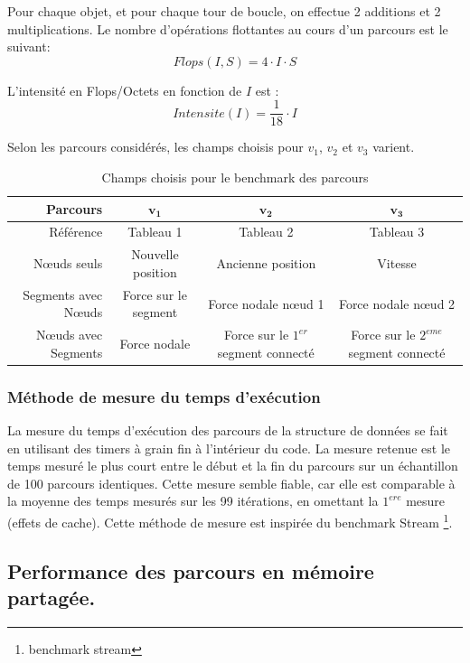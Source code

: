 Pour chaque objet, et pour chaque tour de boucle, on effectue 2 additions et 2 multiplications. Le nombre d'opérations flottantes au cours d'un parcours est le suivant:
\begin{equation}
	Flops(I,S) = 4 \cdot I \cdot S
\end{equation}

L'intensité en Flops/Octets en fonction de $I$ est :
\begin{equation}
	Intensite(I) = \frac{1}{18} \cdot I
\end{equation}

Selon les parcours considérés, les champs choisis pour $v_1$, $v_2$ et $v_3$ varient. 

\begin{table}
	\begin{tabulary}{1.0\textwidth}{r||c|C|C}
		\textbf{Parcours} & $\bm{v_1}$ & $\bm{v_2}$ & $\bm{v_3}$\\
		\hline
		\hline
		Référence & Tableau 1 & Tableau 2 & Tableau 3 \\
		\hline
		Nœuds seuls & Nouvelle position & Ancienne position & Vitesse\\
		\hline
		Segments avec Nœuds & Force sur le segment & Force nodale nœud 1 & Force nodale nœud 2\\
		\hline
		Nœuds avec Segments & Force nodale & Force sur le $1^{er}$ segment connecté & Force sur le  $2^{eme}$ segment connecté\\
	\end{tabulary}
	\caption{ Champs choisis pour le benchmark des parcours }
\end{table}

\subsubsection{Méthode de mesure du temps d'exécution}

La mesure du temps d'exécution des parcours de la structure de données se fait en utilisant des timers à grain fin à l'intérieur du code. La mesure retenue est le temps mesuré le plus court entre le début et la fin du parcours sur un échantillon de 100 parcours identiques. Cette mesure semble fiable, car elle est comparable à la moyenne des temps mesurés sur les 99 itérations, en omettant la $1^{ere}$ mesure (effets de cache). Cette méthode de mesure est inspirée du benchmark Stream \footnote{benchmark stream}.

\subsection{Performance des parcours en mémoire partagée.}

